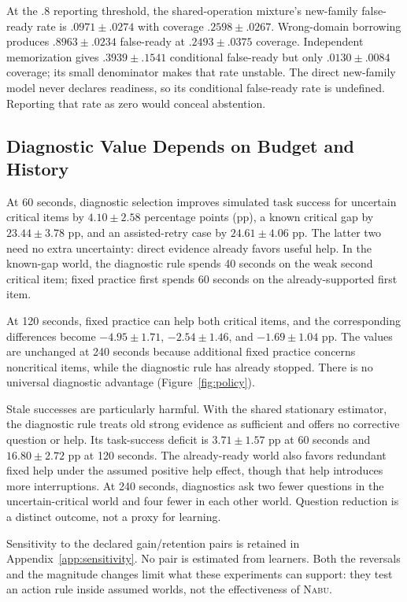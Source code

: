 \documentclass{article}
\newcommand{\Nabu}{\textsc{Nabu}}
\begin{document}
At the .8 reporting threshold, the shared-operation mixture's new-family false-ready rate is $.0971\pm.0274$ with coverage $.2598\pm.0267$. Wrong-domain borrowing produces $.8963\pm.0234$ false-ready at $.2493\pm.0375$ coverage. Independent memorization gives $.3939\pm.1541$ conditional false-ready but only $.0130\pm.0084$ coverage; its small denominator makes that rate unstable. The direct new-family model never declares readiness, so its conditional false-ready rate is undefined. Reporting that rate as zero would conceal abstention.

\subsection{Diagnostic Value Depends on Budget and History}

At 60 seconds, diagnostic selection improves simulated task success for uncertain critical items by $4.10\pm2.58$ percentage points (pp), a known critical gap by $23.44\pm3.78$ pp, and an assisted-retry case by $24.61\pm4.06$ pp. The latter two need no extra uncertainty: direct evidence already favors useful help. In the known-gap world, the diagnostic rule spends 40 seconds on the weak second critical item; fixed practice first spends 60 seconds on the already-supported first item.

At 120 seconds, fixed practice can help both critical items, and the corresponding differences become $-4.95\pm1.71$, $-2.54\pm1.46$, and $-1.69\pm1.04$ pp. The values are unchanged at 240 seconds because additional fixed practice concerns noncritical items, while the diagnostic rule has already stopped. There is no universal diagnostic advantage (Figure~\ref{fig:policy}).

Stale successes are particularly harmful. With the shared stationary estimator, the diagnostic rule treats old strong evidence as sufficient and offers no corrective question or help. Its task-success deficit is $3.71\pm1.57$ pp at 60 seconds and $16.80\pm2.72$ pp at 120 seconds. The already-ready world also favors redundant fixed help under the assumed positive help effect, though that help introduces more interruptions. At 240 seconds, diagnostics ask two fewer questions in the uncertain-critical world and four fewer in each other world. Question reduction is a distinct outcome, not a proxy for learning.

Sensitivity to the declared gain/retention pairs is retained in Appendix~\ref{app:sensitivity}. No pair is estimated from learners. Both the reversals and the magnitude changes limit what these experiments can support: they test an action rule inside assumed worlds, not the effectiveness of \Nabu{}.
\end{document}
